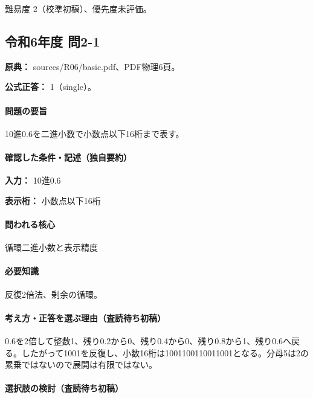 \par 難易度 2（校準初稿）、優先度未評価。

\subsection{令和6年度 問2-1}
\label{q:r06-reg-basic-2-1}

\noindent\textbf{原典：} sources/R06/basic.pdf、PDF物理6頁。

\textbf{公式正答：} 1（single）。

\paragraph{問題の要旨} 10進0.6を二進小数で小数点以下16桁まで表す。

\paragraph{確認した条件・記述（独自要約）}\mbox{}\par

\noindent\textbf{入力：} 10進0.6\par

\noindent\textbf{表示桁：} 小数点以下16桁\par

\paragraph{問われる核心} 循環二進小数と表示精度

\paragraph{必要知識} 反復2倍法、剰余の循環。

\paragraph{考え方・正答を選ぶ理由（査読待ち初稿）} 0.6を2倍して整数1、残り0.2から0、残り0.4から0、残り0.8から1、残り0.6へ戻る。したがって1001を反復し、小数16桁は1001100110011001となる。分母5は2の累乗ではないので展開は有限ではない。

\paragraph{選択肢の検討（査読待ち初稿）}\mbox{}\par

